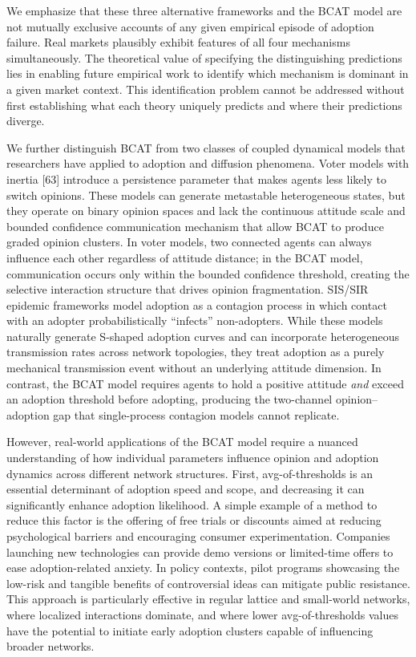 \documentclass[10pt,letterpaper]{article}
\begin{document}
We emphasize that these three alternative frameworks and the BCAT model are not mutually exclusive accounts of any given empirical episode of adoption failure. Real markets plausibly exhibit features of all four mechanisms simultaneously. The theoretical value of specifying the distinguishing predictions lies in enabling future empirical work to identify which mechanism is dominant in a given market context. This identification problem cannot be addressed without first establishing what each theory uniquely predicts and where their predictions diverge.

We further distinguish BCAT from two classes of coupled dynamical models that researchers have applied to adoption and diffusion phenomena. Voter models with inertia [63] introduce a persistence parameter that makes agents less likely to switch opinions. These models can generate metastable heterogeneous states, but they operate on binary opinion spaces and lack the continuous attitude scale and bounded confidence communication mechanism that allow BCAT to produce graded opinion clusters. In voter models, two connected agents can always influence each other regardless of attitude distance; in the BCAT model, communication occurs only within the bounded confidence threshold, creating the selective interaction structure that drives opinion fragmentation. SIS/SIR epidemic frameworks model adoption as a contagion process in which contact with an adopter probabilistically ``infects'' non-adopters. While these models naturally generate S-shaped adoption curves and can incorporate heterogeneous transmission rates across network topologies, they treat adoption as a purely mechanical transmission event without an underlying attitude dimension. In contrast, the BCAT model requires agents to hold a positive attitude \textit{and} exceed an adoption threshold before adopting, producing the two-channel opinion--adoption gap that single-process contagion models cannot replicate.

However, real-world applications of the BCAT model require a nuanced understanding of how individual parameters influence opinion and adoption dynamics across different network structures. First, avg-of-thresholds is an essential determinant of adoption speed and scope, and decreasing it can significantly enhance adoption likelihood. A simple example of a method to reduce this factor is the offering of free trials or discounts aimed at reducing psychological barriers and encouraging consumer experimentation. Companies launching new technologies can provide demo versions or limited-time offers to ease adoption-related anxiety. In policy contexts, pilot programs showcasing the low-risk and tangible benefits of controversial ideas can mitigate public resistance. This approach is particularly effective in regular lattice and small-world networks, where localized interactions dominate, and where lower avg-of-thresholds values have the potential to initiate early adoption clusters capable of influencing broader networks.
\end{document}
